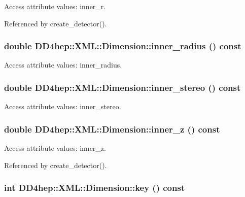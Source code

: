 Access attribute values: inner\_\-r. 

Referenced by create\_\-detector().\hypertarget{struct_d_d4hep_1_1_x_m_l_1_1_dimension_a640fa0cc5ddafe47591a43beb6fbc52f}{
\subsubsection[{inner\_\-radius}]{\setlength{\rightskip}{0pt plus 5cm}double DD4hep::XML::Dimension::inner\_\-radius () const}}
\label{struct_d_d4hep_1_1_x_m_l_1_1_dimension_a640fa0cc5ddafe47591a43beb6fbc52f}


Access attribute values: inner\_\-radius. \hypertarget{struct_d_d4hep_1_1_x_m_l_1_1_dimension_af3025ef3808bd4fd9566630901318ba1}{
\subsubsection[{inner\_\-stereo}]{\setlength{\rightskip}{0pt plus 5cm}double DD4hep::XML::Dimension::inner\_\-stereo () const}}
\label{struct_d_d4hep_1_1_x_m_l_1_1_dimension_af3025ef3808bd4fd9566630901318ba1}


Access attribute values: inner\_\-stereo. \hypertarget{struct_d_d4hep_1_1_x_m_l_1_1_dimension_a8b6647f4fbc2a6a91c441f796e6a1b4b}{
\subsubsection[{inner\_\-z}]{\setlength{\rightskip}{0pt plus 5cm}double DD4hep::XML::Dimension::inner\_\-z () const}}
\label{struct_d_d4hep_1_1_x_m_l_1_1_dimension_a8b6647f4fbc2a6a91c441f796e6a1b4b}


Access attribute values: inner\_\-z. 

Referenced by create\_\-detector().\hypertarget{struct_d_d4hep_1_1_x_m_l_1_1_dimension_a1bf67b433bddb96f1e550a45c513d727}{
\subsubsection[{key}]{\setlength{\rightskip}{0pt plus 5cm}int DD4hep::XML::Dimension::key () const}}
\label{struct_d_d4hep_1_1_x_m_l_1_1_dimension_a1bf67b433bddb96f1e550a45c513d727}


